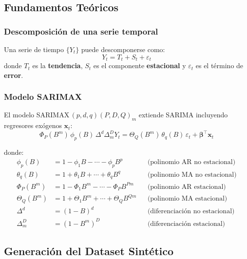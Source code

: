 \documentclass[12pt, a4paper]{article}
\begin{document}
\subsection{Fundamentos Teóricos}

\subsubsection{Descomposición de una serie temporal}

Una serie de tiempo $\{Y_t\}$ puede descomponerse como:
\[
  Y_t = T_t + S_t + \varepsilon_t
\]
donde $T_t$ es la \textbf{tendencia}, $S_t$ es el componente
\textbf{estacional} y $\varepsilon_t$ es el término de \textbf{error}.

\subsubsection{Modelo SARIMAX}

El modelo SARIMAX$\,(p,d,q)(P,D,Q)_m$ extiende SARIMA incluyendo regresores
exógenos $\mathbf{x}_t$:
\[
  \Phi_P(B^m)\,\phi_p(B)\,\Delta^d\Delta_m^D Y_t
  = \Theta_Q(B^m)\,\theta_q(B)\,\varepsilon_t + \boldsymbol{\beta}^\top \mathbf{x}_t
\]

donde:
\begin{align*}
  \phi_p(B)    &= 1 - \phi_1 B - \cdots - \phi_p B^p & &\text{(polinomio AR no estacional)} \\
  \theta_q(B)  &= 1 + \theta_1 B + \cdots + \theta_q B^q & &\text{(polinomio MA no estacional)} \\
  \Phi_P(B^m)  &= 1 - \Phi_1 B^m - \cdots - \Phi_P B^{Pm} & &\text{(polinomio AR estacional)} \\
  \Theta_Q(B^m)&= 1 + \Theta_1 B^m + \cdots + \Theta_Q B^{Qm} & &\text{(polinomio MA estacional)} \\
  \Delta^d     &= (1-B)^d & &\text{(diferenciación no estacional)} \\
  \Delta_m^D   &= (1-B^m)^D & &\text{(diferenciación estacional)}
\end{align*}

\subsection{Generación del Dataset Sintético}
\end{document}
